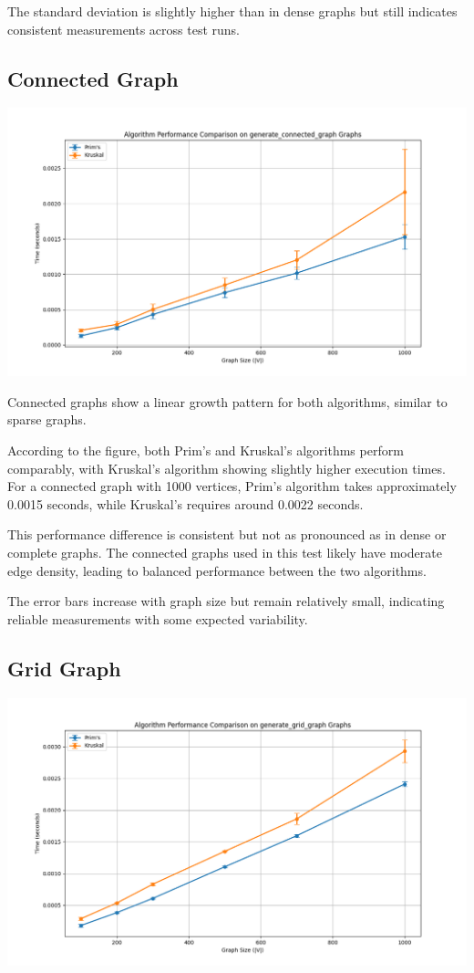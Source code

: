 \documentclass[a4paper,12pt]{article}
\begin{document}
The standard deviation is slightly higher than in dense graphs but still indicates consistent measurements across test runs.
\subsection{Connected Graph}
\label{sec:org2c4a35e}
\begin{center}
\includegraphics[width=.9\linewidth]{mst_connected.png}
\label{org1a55bc6}
\end{center}

Connected graphs show a linear growth pattern for both algorithms, similar to sparse graphs.

According to the figure, both Prim's and Kruskal's algorithms perform comparably, with Kruskal's algorithm showing slightly higher execution times. For a connected graph with 1000 vertices, Prim's algorithm takes approximately 0.0015 seconds, while Kruskal's requires around 0.0022 seconds.

This performance difference is consistent but not as pronounced as in dense or complete graphs. The connected graphs used in this test likely have moderate edge density, leading to balanced performance between the two algorithms.

The error bars increase with graph size but remain relatively small, indicating reliable measurements with some expected variability.
\subsection{Grid Graph}
\label{sec:orge463fee}
\begin{center}
\includegraphics[width=.9\linewidth]{mst_grid.png}
\label{orgcad8889}
\end{center}
\end{document}
